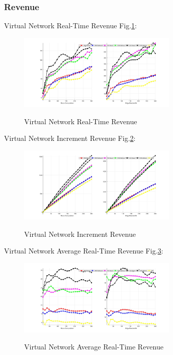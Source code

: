 \subsubsection{Revenue}
Virtual Network Real-Time Revenue Fig.\ref{fig:RevenueCurrentVirtualNetwork}:
\begin{figure}[htbp]
  \centering
  \includegraphics[width=3in]{Fig/RevenueCurrentVirtualNetwork}\\
  \caption{Virtual Network Real-Time Revenue }\label{fig:RevenueCurrentVirtualNetwork}
\end{figure}

Virtual Network Increment Revenue Fig.\ref{fig:RevenueAccumulateVirtualNetwork}:
\begin{figure}[htbp]
  \centering
  \includegraphics[width=3in]{Fig/RevenueAccumulateVirtualNetwork}\\
  \caption{Virtual Network Increment Revenue }\label{fig:RevenueAccumulateVirtualNetwork}
\end{figure}

Virtual Network Average Real-Time Revenue Fig.\ref{fig:RevenueAverageCurrentVirtualNetwork}:
\begin{figure}[htbp]
  \centering
  \includegraphics[width=3in]{Fig/RevenueAverageCurrentVirtualNetwork}\\
  \caption{Virtual Network Average Real-Time Revenue}\label{fig:RevenueAverageCurrentVirtualNetwork}
\end{figure}

